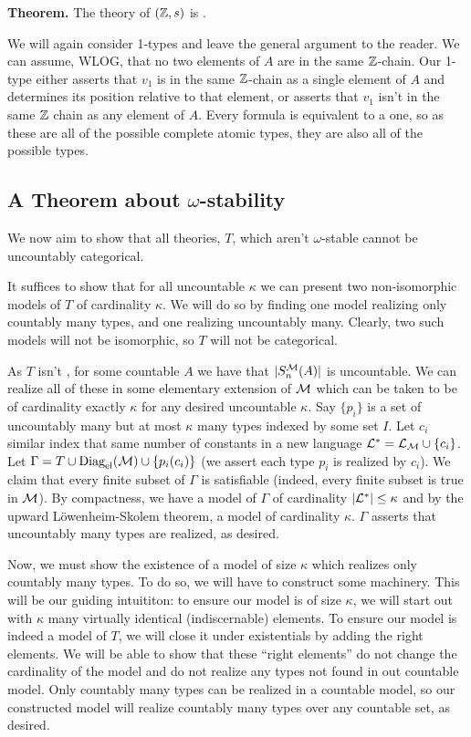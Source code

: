 \textbf{Theorem.} The theory of \((\mathbb{Z}, s)\) is \omst. 

We will again consider 1-types and leave the general argument to the reader. 
We can assume, WLOG, that no two elements of \(A\) are in the same \(\mathbb{Z}\)-chain. 
Our 1-type either asserts that \(v_1\) is in the same \(\mathbb{Z}\)-chain as a single element of \(A\) and determines its position relative to that element, or asserts that \(v_1\) isn't in the same \(\mathbb{Z}\) chain as any element of \(A\). 
Every formula is equivalent to a \qf one, so as these are all of the possible complete atomic types, they are also all of the possible types.    

\subsection{A Theorem about \(\omega\)-stability}

We now aim to show that all theories, \(T\), which aren't \(\omega\)-stable cannot be uncountably categorical.

It suffices to show that for all uncountable \(\kappa\) we can present two non-isomorphic models of \(T\) of cardinality \(\kappa\). 
We will do so by finding one model realizing only countably many types, and one realizing uncountably many. 
Clearly, two such models will not be isomorphic, so \(T\) will not be categorical. 

As \(T\) isn't \omst, for some countable \(A\) we have that \(|S_n^{\mathcal{M}}(A)|\) is uncountable. 
We can realize all of these in some elementary extension of \(\mathcal{M}\) which can be taken to be of cardinality exactly \(\kappa\) for any desired uncountable \(\kappa\). 
Say \(\{p_i\}\) is a set of uncountably many but at most \(\kappa\) many types indexed by some set \(I\). 
Let \(c_i\) similar index that same number of constants in a new language \(\mathcal{L}^* = \mathcal{L}_{\mathcal{M}} \cup \{c_i\}\). 
Let \(\Gamma = T \cup \text{Diag}_\text{el}(\mathcal{M}) \cup \{p_i(c_i)\}\) (we assert each type \(p_i\) is realized by \(c_i\)). 
We claim that every finite subset of \(\Gamma\) is satisfiable (indeed, every finite subset is true in \(\mathcal{M}\)).
By compactness, we have a model of \(\Gamma\) of cardinality \(|\mathcal{L}^*| \leq \kappa\) and by the upward L\"owenheim-Skolem theorem, a model of cardinality \(\kappa\).
\(\Gamma\) asserts that uncountably many types are realized, as desired. 

Now, we must show the existence of a model of size \(\kappa\) which realizes only countably many types. To do so, we will have to construct some machinery.
This will be our guiding intuititon: to ensure our model is of size \(\kappa\), we will start out with \(\kappa\) many virtually identical (indiscernable) elements. 
To ensure our model is indeed a model of \(T\), we will close it under existentials by adding the right elements. 
We will be able to show that these ``right elements'' do not change the cardinality of the model and do not realize any types not found in out countable model.
Only countably many types can be realized in a countable model, so our constructed model will realize countably many types over any countable set, as desired. 

